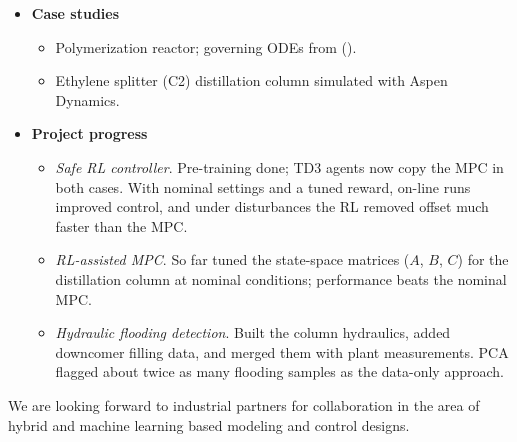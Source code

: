 \begin{itemize}
    \item \textbf{Case studies}
    \begin{itemize}
        \item Polymerization reactor; governing ODEs from (\cite{bustos2016application}).
        \item Ethylene splitter (C2) distillation column simulated with Aspen Dynamics.
    \end{itemize}

    \item \textbf{Project progress}
    \begin{itemize}
        \item \textit{Safe RL controller}. Pre-training done; TD3 agents now copy the MPC in both cases. With nominal settings and a tuned reward, on-line runs improved control, and under disturbances the RL removed offset much faster than the MPC.
        \item \textit{RL-assisted MPC}. So far tuned the state-space matrices ($A$, $B$, $C$) for the distillation column at nominal conditions; performance beats the nominal MPC.
        \item \textit{Hydraulic flooding detection}. Built the column hydraulics, added downcomer filling data, and merged them with plant measurements. PCA flagged about twice as many flooding samples as the data-only approach.
    \end{itemize}
\end{itemize}



\IndustrialCollaborationSought

We are looking forward to industrial partners for collaboration in the area of hybrid and machine learning based modeling and control designs.



\nocite{Bonvin1997} \nocite{bonvin2001} \nocite{datta94}
\nocite{ingruber85} \nocite{kayihan97} \nocite{kilian00}
\nocite{qin2000a} \nocite{Rawlings1989} \nocite{Ruppen1997}
\nocite{Rydholm1965} \nocite{smook92} \nocite{visser00}





